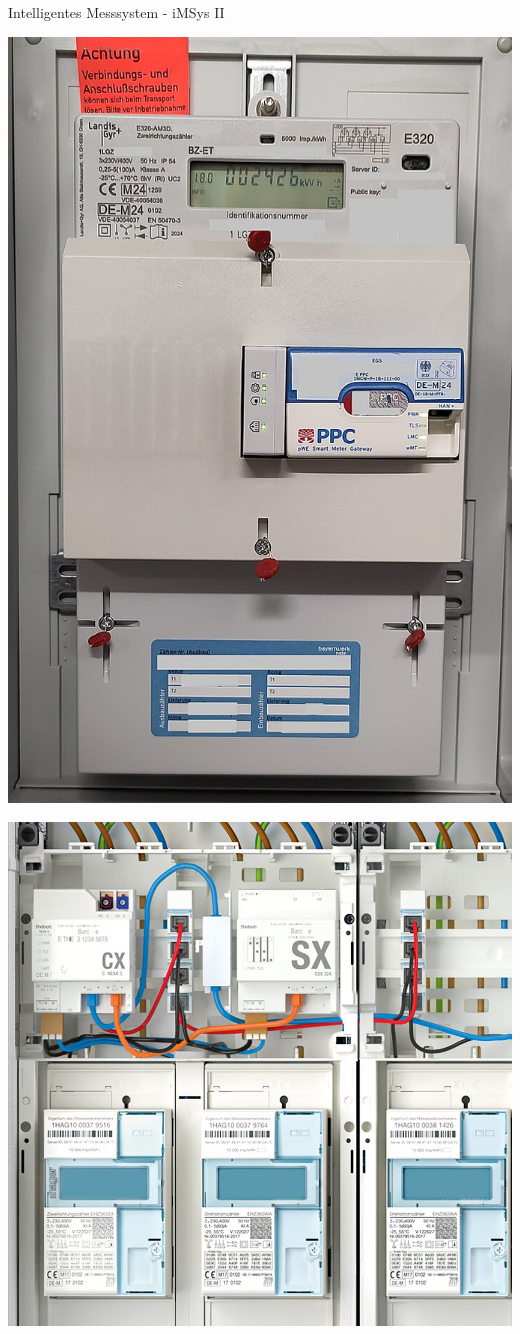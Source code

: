 \begin{frame}{Intelligentes Messsystem - iMSys II}
   \begin{center}
      \begin{minipage}{0.34\textwidth}
         \centering
         \includegraphics[width=\linewidth]{images/SmartMeter.jpg}
      \end{minipage}
      \begin{minipage}{0.64\textwidth}
         \centering
         \includegraphics[width=0.8\linewidth]{images/technikzentrale.png}

\end{minipage}
\end{center}
\end{frame}
